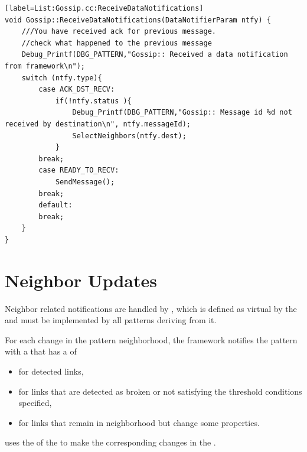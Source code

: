 \begin{lstlisting}[style=boralargefile] [label=List:Gossip.cc:ReceiveDataNotifications]
void Gossip::ReceiveDataNotifications(DataNotifierParam ntfy) {
	///You have received ack for previous message.
	//check what happened to the previous message
	Debug_Printf(DBG_PATTERN,"Gossip:: Received a data notification from framework\n");
	switch (ntfy.type){
		case ACK_DST_RECV:
			if(!ntfy.status ){
				Debug_Printf(DBG_PATTERN,"Gossip:: Message id %d not received by destination\n", ntfy.messageId);
				SelectNeighbors(ntfy.dest);
			}
		break;
		case READY_TO_RECV:
			SendMessage();
		break;
		default:
		break;
	}
}
\end{lstlisting}

\section {Neighbor Updates} \label{sec:NeighborUpdateEvent}
Neighbor related notifications are handled by
, which
is defined as virtual by the  and must be implemented by all patterns deriving from it. 

For each change in the pattern neighborhood, the framework notifies the pattern with a  that has a  of  
\begin{itemize}
\item {} for detected links, 
\item {} for links that are detected as broken or not satisfying the threshold conditions specified,
\item {} for links that remain in neighborhood but change some properties.
\end{itemize}
 uses the  of the  to make the corresponding changes in the .

